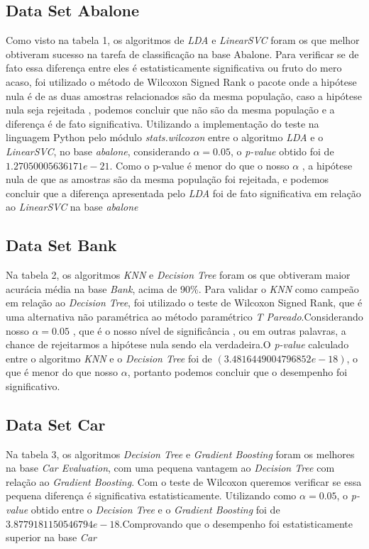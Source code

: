 \documentclass[11pt]{article}
\begin{document}
\subsection{Data Set Abalone}
    Como visto na tabela 1, os algoritmos de \emph{LDA} e \emph{LinearSVC} foram os que melhor obtiveram sucesso na tarefa de classificação na base Abalone. Para verificar se de fato essa diferença entre eles é estatisticamente significativa ou fruto do mero acaso, foi utilizado o método de Wilcoxon Signed Rank \cite{Garciaetal2008}\cite{scipy} o pacote onde a hipótese nula é de as duas amostras relacionados são da mesma população, caso a hipótese nula seja rejeitada , podemos concluir que não são da mesma população e a diferença é de fato significativa.
    Utilizando a implementação do teste na linguagem Python pelo módulo \emph{stats.wilcoxon} entre o algoritmo \emph{LDA} e o \emph{LinearSVC}, no base \emph{abalone}, considerando $\alpha = 0.05$, o \emph{p-value} obtido foi de $1.27050005636171e-21$. Como o p-value é menor do que o nosso $\alpha$ , a hipótese nula de que as amostras são da mesma população foi rejeitada, e podemos concluir que a diferença apresentada pelo \emph{LDA} foi de fato significativa em relação ao \emph{LinearSVC} na base \emph{abalone}

\subsection{Data Set Bank}
    Na tabela 2, os algoritmos \emph{KNN} e \emph{Decision Tree} foram os que obtiveram maior acurácia média na base \emph{Bank}, acima de 90\%.
    Para validar o \emph{KNN} como campeão em relação ao \emph{Decision Tree}, foi utilizado o teste de Wilcoxon Signed Rank, que é uma alternativa não paramétrica ao método paramétrico \emph{T Pareado}.Considerando nosso $\alpha = 0.05$ , que é o nosso nível de significância , ou em outras palavras, a chance de rejeitarmos a hipótese nula sendo ela verdadeira.O \emph{p-value} calculado entre o algoritmo \emph{KNN} e o \emph{Decision Tree} foi de $( 3.4816449004796852e-18)$, o que é menor do que nosso $\alpha$, portanto podemos concluir que o desempenho foi significativo.

\subsection{Data Set Car}
    Na tabela 3, os algoritmos \emph{Decision Tree} e \emph{Gradient Boosting} foram os melhores na base \emph{Car Evaluation}, com uma pequena vantagem ao \emph{Decision Tree} com relação ao \emph{Gradient Boosting}.
    Com o teste de Wilcoxon queremos verificar se essa pequena diferença é significativa estatisticamente. Utilizando como $\alpha = 0.05$, o \emph{p-value} obtido entre o \emph{Decision Tree} e o \emph{Gradient Boosting} foi de $3.8779181150546794e-18$.Comprovando que o desempenho foi estatisticamente superior na base \emph{Car}
\end{document}
